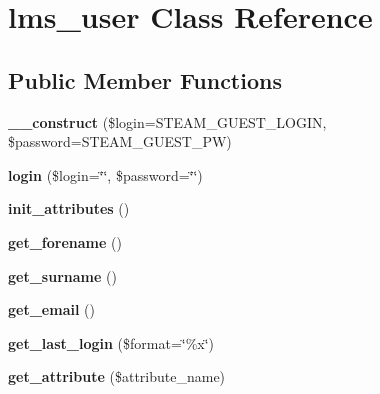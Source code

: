 \hypertarget{classlms__user}{
\section{lms\_\-user Class Reference}
\label{classlms__user}
}
\subsection*{Public Member Functions}
\begin{DoxyCompactItemize}
\item 
\hypertarget{classlms__user_a7c3cf78d46a88a179681ea1a5ce16794}{
{\bfseries \_\-\_\-construct} (\$login=STEAM\_\-GUEST\_\-LOGIN, \$password=STEAM\_\-GUEST\_\-PW)}
\label{classlms__user_a7c3cf78d46a88a179681ea1a5ce16794}

\item 
\hypertarget{classlms__user_af9f6ecebb3e479dde5be8c53db39d749}{
{\bfseries login} (\$login=\char`\"{}\char`\"{}, \$password=\char`\"{}\char`\"{})}
\label{classlms__user_af9f6ecebb3e479dde5be8c53db39d749}

\item 
\hypertarget{classlms__user_a276d135630eba9cb0f8c789eac52671c}{
{\bfseries init\_\-attributes} ()}
\label{classlms__user_a276d135630eba9cb0f8c789eac52671c}

\item 
\hypertarget{classlms__user_a56581008efe9532f04b1c61148fcd2d0}{
{\bfseries get\_\-forename} ()}
\label{classlms__user_a56581008efe9532f04b1c61148fcd2d0}

\item 
\hypertarget{classlms__user_acafb8215e692558b52e92beb790dc545}{
{\bfseries get\_\-surname} ()}
\label{classlms__user_acafb8215e692558b52e92beb790dc545}

\item 
\hypertarget{classlms__user_a87de8e7574346ae9928d2569db39de62}{
{\bfseries get\_\-email} ()}
\label{classlms__user_a87de8e7574346ae9928d2569db39de62}

\item 
\hypertarget{classlms__user_a31125163e71435f7ded1e40fc513b205}{
{\bfseries get\_\-last\_\-login} (\$format=\char`\"{}\%x\char`\"{})}
\label{classlms__user_a31125163e71435f7ded1e40fc513b205}

\item 
\hypertarget{classlms__user_a8b33b2571c433915d0b1f041b147b6b0}{
{\bfseries get\_\-attribute} (\$attribute\_\-name)}
\label{classlms__user_a8b33b2571c433915d0b1f041b147b6b0}


\end{DoxyCompactItemize}
